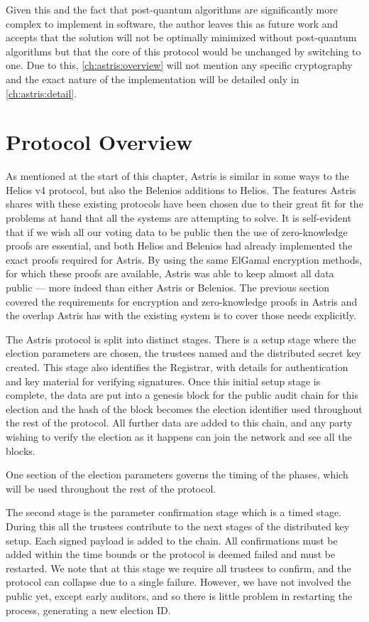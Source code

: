 Given this and the fact that post-quantum algorithms are significantly more complex to implement in software, the author leaves this as future work and accepts that the solution will not be optimally minimized without post-quantum algorithms but that the core of this protocol would be unchanged by switching to one. Due to this, \autoref{ch:astris:overview} will not mention any specific cryptography and the exact nature of the implementation will be detailed only in \autoref{ch:astris:detail}.

\section{Protocol Overview}
\label{ch:astris:overview}

As mentioned at the start of this chapter, Astris is similar in some ways to the Helios v4 protocol, but also the Belenios additions to Helios. The features Astris shares with these existing protocols have been chosen due to their great fit for the problems at hand that all the systems are attempting to solve. It is self-evident that if we wish all our voting data to be public then the use of zero-knowledge proofs are essential, and both Helios and Belenios had already implemented the exact proofs required for Astris. By using the same ElGamal encryption methods, for which these proofs are available, Astris was able to keep almost all data public --- more indeed than either Astris or Belenios. The previous section covered the requirements for encryption and zero-knowledge proofs in Astris and the overlap Astris has with the existing system is to cover those needs explicitly.

The Astris protocol is split into distinct stages. There is a setup stage where the election parameters are chosen, the trustees named and the distributed secret key created. This stage also identifies the Registrar, with details for authentication and key material for verifying signatures. Once this initial setup stage is complete, the data are put into a genesis block for the public audit chain for this election and the hash of the block becomes the election identifier used throughout the rest of the protocol. All further data are added to this chain, and any party wishing to verify the election as it happens can join the network and see all the blocks.

One section of the election parameters governs the timing of the phases, which will be used throughout the rest of the protocol.

The second stage is the parameter confirmation stage which is a timed stage. During this all the trustees contribute to the next stages of the distributed key setup. Each signed payload is added to the chain. All confirmations must be added within the time bounds or the protocol is deemed failed and must be restarted. We note that at this stage we require all trustees to confirm, and the protocol can collapse due to a single failure. However, we have not involved the public yet, except early auditors, and so there is little problem in restarting the process, generating a new election ID.

